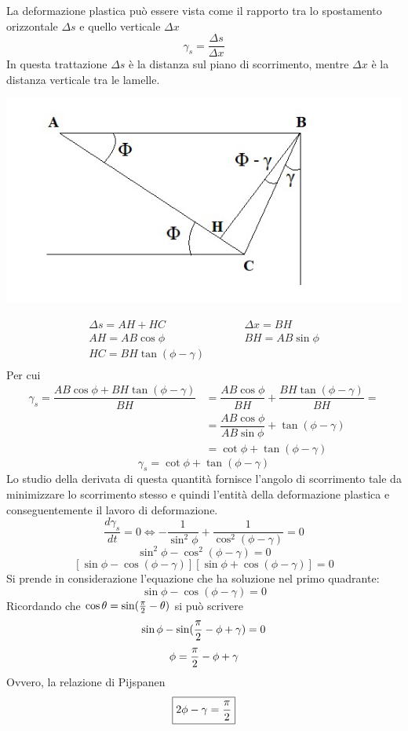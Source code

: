 \documentclass[a4paper, 15pt]{article}
\begin{document}
	La deformazione plastica può essere vista come il rapporto tra lo spostamento orizzontale $\Delta s$ e quello verticale $\Delta x$
	\[\gamma_s = \dfrac{\Delta s}{\Delta x}\] 
	In questa trattazione $\Delta s$ è la distanza sul piano di scorrimento, mentre $\Delta x$ è la distanza verticale tra le lamelle.
\begin{center}
	\includegraphics[width=0.5\linewidth]{figures/asp6}
\end{center}
	\[\begin{matrix}
		\Delta s = AH + HC & \qquad & \Delta x = BH\\
		AH = AB\cos\phi & \qquad & BH = AB\sin\phi \\
		HC = BH\tan(\phi-\gamma) & & \\
	\end{matrix}\]
	Per cui
	\[\begin{aligned}
		\gamma_s  = \dfrac{AB\cos\phi+BH\tan(\phi-\gamma)}{BH} &= \dfrac{AB\cos\phi}{BH} + \dfrac{BH\tan(\phi-\gamma)}{BH} = \\
		& = \dfrac{AB\cos\phi}{AB\sin\phi} + \tan(\phi-\gamma) \\
		& = \cot\phi + \tan(\phi-\gamma)
	\end{aligned} 
	\] 
	\begin{equation}\label{eq:13}
		\gamma_s = \cot\phi + \tan(\phi-\gamma)
	\end{equation}
	Lo studio della derivata di questa quantità fornisce l'angolo di scorrimento tale da minimizzare lo scorrimento stesso e quindi l'entità della deformazione plastica e conseguentemente il lavoro di deformazione. 
	\[\dfrac{d\gamma_s}{dt} = 0 \Leftrightarrow -\dfrac{1}{\sin^2\phi} + \dfrac{1}{\cos^2(\phi-\gamma)} = 0\]
	\[\sin^2\phi - \cos^2(\phi-\gamma) = 0\]
	\[\left[\sin\phi-\cos(\phi-\gamma)\right]\left[\sin\phi+\cos(\phi-\gamma)\right] = 0\]
	Si prende in considerazione l'equazione che ha soluzione nel primo quadrante:
	\[\sin\phi-\cos(\phi-\gamma)=0\]
	Ricordando che \(\cos\theta = \sin({\pi\over2}-\theta)\) si può scrivere
	\[\sin\phi-\sin({\pi\over2}-\phi+\gamma)=0\]
	\[\phi = {\pi\over2}-\phi+\gamma\]
	Ovvero, la relazione di Pijspanen 
	\begin{equation}\label{eq:14}
		\boxed{2\phi-\gamma = {\pi\over2}}
	\end{equation}
\end{document}
